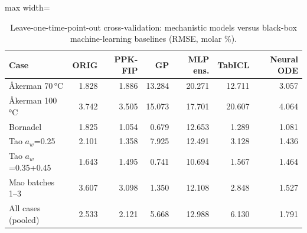 \begin{table}[t]
\centering
\caption{Leave-one-time-point-out cross-validation: mechanistic models versus black-box machine-learning baselines (RMSE, molar \%).}\label{tab:lotobb}
\footnotesize
\begin{adjustbox}{max width=\linewidth}
\begin{tabular}{lrrrrrr}
\toprule
Case & ORIG & PPK-FIP & GP & MLP ens. & TabICL & Neural ODE \\
\midrule
Åkerman 70\,°C & 1.828 & 1.886 & 13.284 & 20.271 & 12.711 & 3.057 \\
Åkerman 100\,°C & 3.742 & 3.505 & 15.073 & 17.701 & 20.607 & 4.064 \\
Bornadel & 1.825 & 1.054 & 0.679 & 12.653 & 1.289 & 1.081 \\
Tao $a_w$=0.25 & 2.101 & 1.358 & 7.925 & 12.491 & 3.128 & 1.436 \\
Tao $a_w$=0.35+0.45 & 1.643 & 1.495 & 0.741 & 10.694 & 1.567 & 1.464 \\
Mao batches 1--3 & 3.607 & 3.098 & 1.350 & 12.108 & 2.848 & 1.527 \\
\midrule
All cases (pooled) & 2.533 & 2.121 & 5.668 & 12.988 & 6.130 & 1.791 \\
\bottomrule
\end{tabular}
\end{adjustbox}
\end{table}

